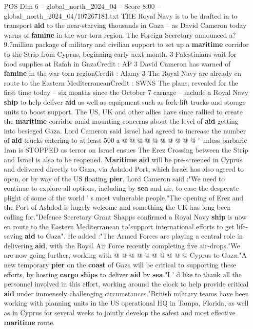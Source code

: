 \begin{textsample}{POS Dim 6 – global\_north\_2024\_04 – Score 8.00 – global\_north\_2024\_04/107267181.txt}  \label{ex:f6_pos_080}
THE Royal Navy is to be drafted in to transport \textbf{aid} to the near-starving thousands in Gaza -- as David Cameron today warns of \textbf{famine} in the war-torn region.
The Foreign Secretary announced a? 9.7million package of military and civilian support to set up a \textbf{maritime} corridor to the Strip from Cyprus, beginning early next month. 3 Palestinians wait for food supplies at Rafah in GazaCredit : AP 3 David Cameron has warned of \textbf{famine} in the war-torn regionCredit : Alamy 3 The Royal Navy are already en route to the Eastern MediterraneanCredit : SWNS The plans, revealed for the first time today -- six months since the October 7 carnage -- include a Royal Navy \textbf{ship} to help deliver \textbf{aid} as well as equipment such as fork-lift trucks and storage units to boost support.
The US, UK and other allies have since rallied to create the \textbf{maritime} corridor amid mounting concerns about the level of \textbf{aid} getting into besieged Gaza.
Lord Cameron said Israel had agreed to increase the number of \textbf{aid} trucks entering to at least 500 a @ @ @ @ @ @ @ @ @ @ ' unless barbaric Iran is STOPPED as terror on Israel ensues The Erez Crossing between the Strip and Israel is also to be reopened. \textbf{Maritime} \textbf{aid} will be pre-screened in Cyprus and delivered directly to Gaza, via Ashdod Port, which Israel has also agreed to open, or by way of the US floating \textbf{pier}.
Lord Cameron said :"We need to continue to explore all options, including by \textbf{sea} and air, to ease the desperate plight of some of the world ' s most vulnerable people."The opening of Erez and the Port of Ashdod is hugely welcome and something the UK has long been calling for."Defence Secretary Grant Shapps confirmed a Royal Navy \textbf{ship} is now en route to the Eastern Mediterranean to"support international efforts to get life-saving \textbf{aid} to Gaza".
He added :"The Armed Forces are playing a central role in delivering \textbf{aid}, with the Royal Air Force recently completing five air-drops."We are now going further, working with @ @ @ @ @ @ @ @ @ @ Cyprus to Gaza."A new temporary \textbf{pier} on the \textbf{coast} of Gaza will be critical to supporting these efforts, by hosting \textbf{cargo} \textbf{ships} to deliver \textbf{aid} by \textbf{sea}."I ' d like to thank all the personnel involved in this effort, working around the clock to help provide critical \textbf{aid} under immensely challenging circumstances."British military teams have been working with planning units in the US operational HQ in Tampa, Florida, as well as in Cyprus for several weeks to jointly develop the safest and most effective \textbf{maritime} route.

\end{textsample}
